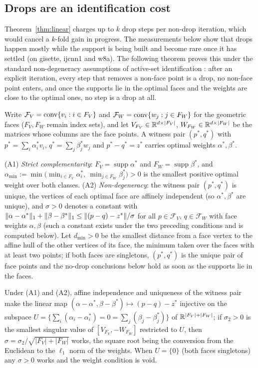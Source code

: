 \subsection{Drops are an identification cost}

Theorem~\ref{thm:linear} charges up to $k$ drop steps per non-drop
iteration, which would cancel a $k$-fold gain in progress. The
measurements below show that drops happen mostly while the support is
being built and become rare once it has settled (on gisette, ijcnn1 and
w8a). The following theorem proves
this under the standard non-degeneracy assumptions of active-set
identification \citep{bomze2020,garber2020}: after an explicit
iteration, every step that removes a non-face point is a drop, no
non-face point enters, and once the supports lie in the optimal faces
and the weights are close to the optimal ones, no step is a drop at all.

Write $\mathcal F_V=\operatorname{conv}\{v_i:i\in F_V\}$ and
$\mathcal F_W=\operatorname{conv}\{w_j:j\in F_W\}$ for the geometric faces ($F_V,F_W$
remain index sets), and let $V_{F_V}\in\mathbb{R}^{d\times|F_V|}$,
$W_{F_W}\in\mathbb{R}^{d\times|F_W|}$ be the matrices whose columns are the face
points. A witness pair $(p^*,q^*)$ with $p^*=\sum_i\alpha^*_iv_i$,
$q^*=\sum_j\beta^*_jw_j$ and $p^*-q^*=z^*$ carries optimal weights
$\alpha^*,\beta^*$.
\begin{assumption}\label{ass:nondeg}
(A1) \emph{Strict complementarity}: $F_V=\operatorname{supp}\alpha^*$ and
$F_W=\operatorname{supp}\beta^*$, and
$\alpha_{\min}:=\min\big(\min_{i\in F_V}\alpha^*_i,\ \min_{j\in F_W}\beta^*_j\big)>0$
is the smallest positive optimal weight over both classes. (A2)
\emph{Non-degeneracy}: the witness pair $(p^*,q^*)$ is unique, the
vertices of each optimal face are affinely independent (so
$\alpha^*,\beta^*$ are unique), and $\sigma>0$ denotes a constant with
$\lVert \alpha-\alpha^* \rVert_1+\lVert \beta-\beta^* \rVert_1\le\lVert (p-q)-z^* \rVert/\sigma$
for all $p\in\mathcal F_V$, $q\in\mathcal F_W$ with face weights
$\alpha,\beta$ (such a constant exists under the two preceding
conditions and is computed below). Let $d_{\min}>0$ be the smallest distance from a face
vertex to the affine hull of the other vertices of its face, the minimum
taken over the faces with at least two points; if both faces are
singletons, $(p^*,q^*)$ is the unique pair of face points and the
no-drop conclusions below hold as soon as the supports lie in the faces.
\end{assumption}
Under (A1) and (A2), affine independence and uniqueness of the witness
pair make the linear map $(\alpha-\alpha^*,\beta-\beta^*)\mapsto(p-q)-z^*$ injective on the
subspace $U=\{\sum_i(\alpha_i-\alpha^*_i)=0=\sum_j(\beta_j-\beta^*_j)\}$
of $\mathbb{R}^{|F_V|+|F_W|}$; if $\sigma_2>0$ is the smallest singular value of
$[V_{F_V},-W_{F_W}]$ restricted to $U$, then
$\sigma=\sigma_2/\sqrt{|F_V|+|F_W|}$ works, the square root being the
conversion from the Euclidean to the $\ell_1$ norm of the weights. When
$U=\{0\}$ (both faces singletons) any $\sigma>0$ works and the weight
condition is void.

